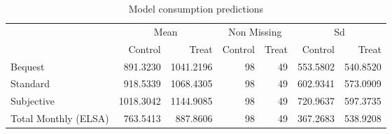 \begin{table}

  \caption{Model consumption predictions \label{tab:SimulationPrediction}}
  \centering
  \begin{tabular}[t]{lrrrrrr}
    \toprule
    \multicolumn{1}{c}{ } & \multicolumn{2}{c}{Mean} & \multicolumn{2}{c}{Non Missing} & \multicolumn{2}{c}{Sd}                               \\
    \cmidrule(l{3pt}r{3pt}){2-3} \cmidrule(l{3pt}r{3pt}){4-5} \cmidrule(l{3pt}r{3pt}){6-7}
                          & Control                  & Treat                           & Control                & Treat & Control  & Treat    \\
    \midrule
    Bequest               & 891.3230                 & 1041.2196                       & 98                     & 49    & 553.5802 & 540.8520 \\
    Standard              & 918.5339                 & 1068.4305                       & 98                     & 49    & 602.9341 & 573.0909 \\
    Subjective            & 1018.3042                & 1144.9085                       & 98                     & 49    & 720.9637 & 597.3735 \\
    Total Monthly (ELSA)  & 763.5413                 & 887.8606                        & 98                     & 49    & 367.2683 & 538.9208 \\
    \bottomrule
  \end{tabular}
\end{table}
